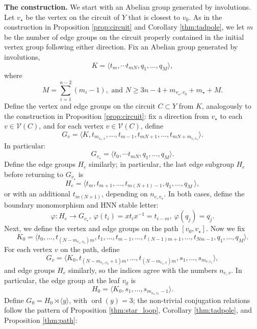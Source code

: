 \documentclass[12pt,leqno]{amsart}
\newcommand{\2}{L^2_{\rm per}(0, T)}
\newcommand{\ord}{{\operatorname{ord}}}
\numberwithin{equation}{section}
\numberwithin{figure}{section}
\begin{document}
\textbf{The construction.} We start with an Abelian group generated by involutions. Let $v_\star$ be the vertex on the circuit of $Y$ that is closest to $v_0$. As in the construction in Proposition \ref{prop:circuit} and Corollary \ref{thm:tadpole}, we let $m$ be the number of edge groups on the circuit properly contained in the initial vertex group following either direction. Fix an Abelian group generated by involutions,
\[
K = \langle t_m,\dotsm t_{mN},q_1,\dots, q_M\rangle,
\]
where
\[
M = \sum_{i=1}^{n-2}(m_i-1),\text{ and }N\geq 3n-4+m_{v_\star,v_0}+m_\star+M.
\]
Define the vertex and edge groups on the circuit $C\subset Y$ from $K$, analogously to the construction in Proposition \ref{prop:circuit}: fix a direction from $v_\star$ to each $v\in\mathcal{V}(C)$, and for each vertex $v\in\mathcal{V}(C)$, define
\[
    G_v = \langle K, t_{m_{v_\star,v}},\dots, t_{m-1}, t_{mN+1},\dots, t_{mN+m_{v,v_\star}}\rangle.
\]
In particular:
\[
    G_{v_\star} = \langle t_0,\dotsm t_{mN},q_1,\dots, q_M\rangle.
\]
Define the edge groups $H_e$ similarly; in particular, the last edge subgroup $H_e$ before returning to $G_{v_\star}$ is
\[
    H_e = \langle t_{m},t_{m+1},\dots, t_{m(N+1)-1},q_1,\dots, q_M\ \rangle,
\]
or with an additional $t_{m(N+1)}$, depending on $n_{e,v_\star}$. In both cases, define the boundary monomorphism and HNN stable letter:
\[
\varphi: H_e\to G_{v_\star},\ \varphi(t_{i}) = xt_ix^{-1} = t_{i-m},\ \varphi(q_j) = q_j.
\]
Next, we define the vertex and edge groups on the path $[v_0,v_\star]$. Now we fix
\[
K_0 = \langle t_0,\dots, t_{(N-m_{v_\star,v_0})m}, t_1,\dots, t_{m-1},\dots, t_{(N-1)m+1},\dots, t_{Nm-1}, q_1,\dots, q_M\rangle.
\]
For each vertex $v$ on the path, define
\[
G_v = \langle K_0, t_{(N-m_{v_\star,v_0}+1)m},\dots, t_{(N-m_{v_\star,v})m}, s_1,\dots, s_{m_{v,v_\star}}\rangle,
\]
and edge groups $H_e$ similarly, so the indices agree with the numbers $n_{e,v}$. In particular, the edge group at the leaf $v_0$ is
\[
H_0 = \langle K_0, s_1,\dots, s_{m_{v_0,v_\star}-1}\rangle.
\]
Define $G_0= H_0\rtimes \langle y\rangle$, with $\ord(y) = 3$; the non-trivial conjugation relations follow the pattern of Proposition \ref{thm:star_loop}, Corollary \ref{thm:tadpole}, and Proposition \ref{thm:path}: 
\end{document}
